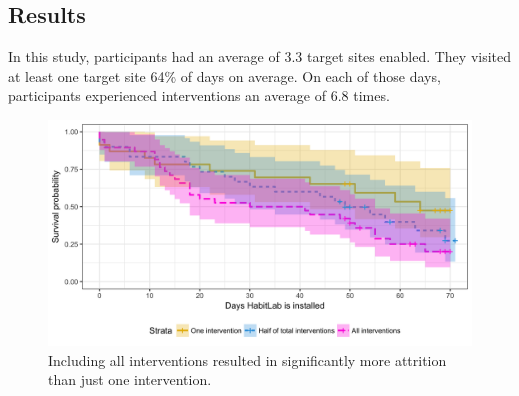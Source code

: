 \subsection{Results}

In this study, participants had an average of 3.3 target sites enabled. They visited at least one target site 64\% of days on average. On each of those days, participants experienced interventions an average of 6.8 times.


\begin{figure}
\centering
	\includegraphics[width=1.0\textwidth]{figures/attrition_between_subjects.png}
	\caption{Including all interventions resulted in significantly more attrition than just one intervention.}
\label{fig:attrition_between_subjects}
\end{figure}

